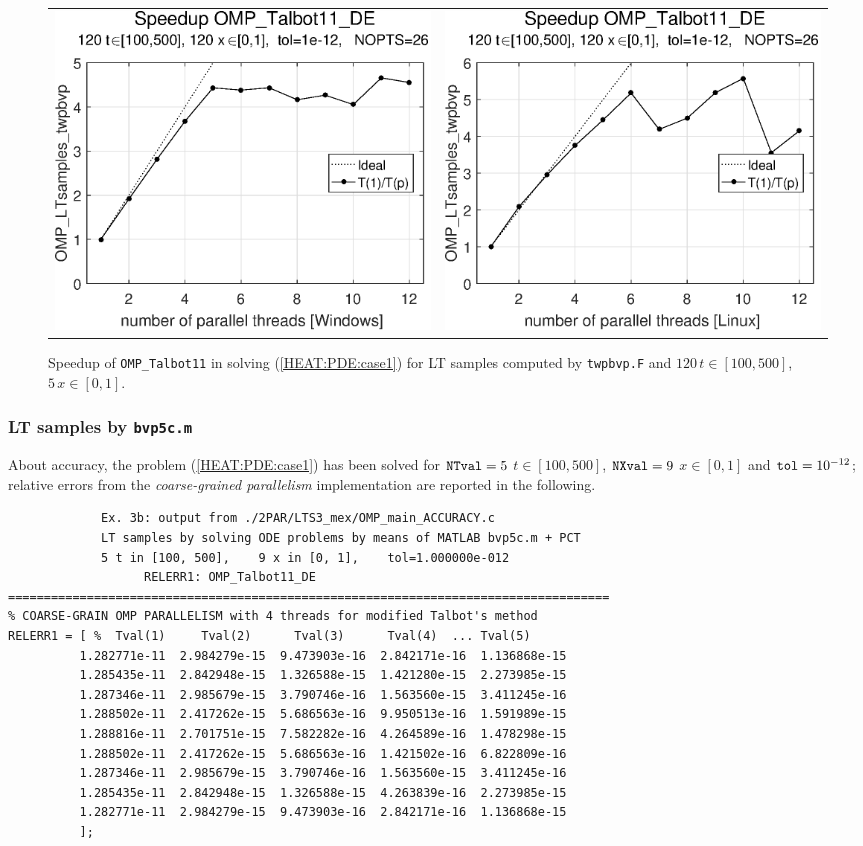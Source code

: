 \documentclass[a4paper,10pt]{report}%
\begin{document}
\begin{figure}[htb]
\centering
\begin{tabular}{cc} %
\includegraphics[height=0.2\textwidth]{./FIGS/EX3b/EX3b_twpbvp_speedup_11_Windows.eps} &
\includegraphics[height=0.2\textwidth]{./FIGS/EX3b/EX3b_twpbvp_speedup_11_Linux.eps}
\end{tabular}
\caption{\small Speedup of {\tt OMP\_Talbot11} in solving (\ref{HEAT:PDE:case1}) for LT samples computed
by {\tt twpbvp.F} and $120\,t\in[100,500]$, $5\,x\in[0,1]$.}
\label{PAR_EX3b_speedup_twpbvp}
\end{figure}


\subsubsection{LT samples by {\tt bvp5c.m}}
About accuracy, the problem (\ref{HEAT:PDE:case1}) has been solved for ${\tt NTval}=5$ $t\in[100, 500]$,
${\tt NXval}=9$ $x\in[0,1]$ and ${\tt tol}=10^{-12}$; relative errors from the {\em coarse-grained parallelism}
implementation are reported in the following.
\begin{lstlisting}
             Ex. 3b: output from ./2PAR/LTS3_mex/OMP_main_ACCURACY.c
             LT samples by solving ODE problems by means of MATLAB bvp5c.m + PCT
             5 t in [100, 500],    9 x in [0, 1],    tol=1.000000e-012
                   RELERR1: OMP_Talbot11_DE
====================================================================================
% COARSE-GRAIN OMP PARALLELISM with 4 threads for modified Talbot's method
RELERR1 = [ %  Tval(1)     Tval(2)      Tval(3)      Tval(4)  ... Tval(5)
          1.282771e-11  2.984279e-15  9.473903e-16  2.842171e-16  1.136868e-15
          1.285435e-11  2.842948e-15  1.326588e-15  1.421280e-15  2.273985e-15
          1.287346e-11  2.985679e-15  3.790746e-16  1.563560e-15  3.411245e-16
          1.288502e-11  2.417262e-15  5.686563e-16  9.950513e-16  1.591989e-15
          1.288816e-11  2.701751e-15  7.582282e-16  4.264589e-16  1.478298e-15
          1.288502e-11  2.417262e-15  5.686563e-16  1.421502e-16  6.822809e-16
          1.287346e-11  2.985679e-15  3.790746e-16  1.563560e-15  3.411245e-16
          1.285435e-11  2.842948e-15  1.326588e-15  4.263839e-16  2.273985e-15
          1.282771e-11  2.984279e-15  9.473903e-16  2.842171e-16  1.136868e-15
          ];
\end{lstlisting}
\end{document}
